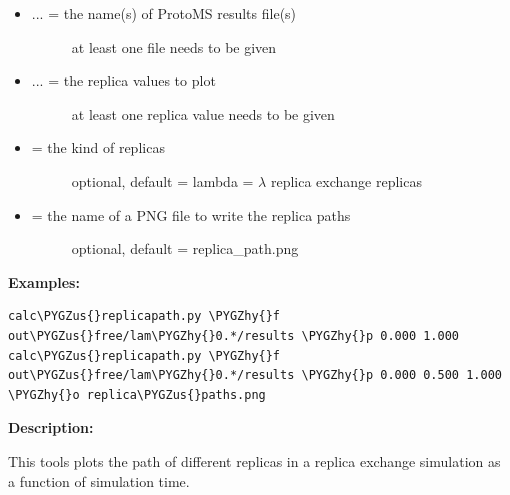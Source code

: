 \documentclass[letterpaper,10pt,english]{sphinxmanual}
\def\PYGZus{\char`\_}
\def\PYGZhy{\char`\-}
\begin{document}
\begin{itemize}
\item {} \begin{description}
\item[{ ... = the name(s) of ProtoMS results file(s)}] \leavevmode
at least one file needs to be given

\end{description}

\item {} \begin{description}
\item[{ ... = the replica values to plot}] \leavevmode
at least one replica value needs to be given

\end{description}

\item {} \begin{description}
\item[{ = the kind of replicas}] \leavevmode
optional, default = lambda
 = \(\lambda\) replica exchange replicas

\end{description}

\item {} \begin{description}
\item[{ = the name of a PNG file to write the replica paths}] \leavevmode
optional, default = replica\_path.png

\end{description}

\end{itemize}

\textbf{Examples:}

\begin{Verbatim}[commandchars=\\\{\}]
calc\PYGZus{}replicapath.py \PYGZhy{}f out\PYGZus{}free/lam\PYGZhy{}0.*/results \PYGZhy{}p 0.000 1.000
calc\PYGZus{}replicapath.py \PYGZhy{}f out\PYGZus{}free/lam\PYGZhy{}0.*/results \PYGZhy{}p 0.000 0.500 1.000 \PYGZhy{}o replica\PYGZus{}paths.png
\end{Verbatim}

\textbf{Description:}

This tools plots the path of different replicas in a replica exchange simulation as a function of simulation time.
\end{document}
